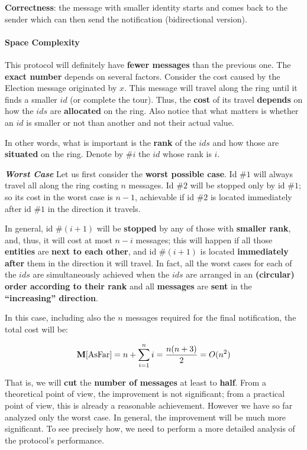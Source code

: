 \textbf{Correctness}: the message with smaller identity starts and comes back to the sender which can then send the notification (bidirectional version).

\paragraph{Space Complexity}
This protocol will definitely have \textbf{fewer messages} than the previous one. The \textbf{exact number} depends on several factors. Consider the cost caused by the Election message originated by $x$. This message will travel along the ring until it finds a smaller $id$ (or complete the tour). Thus, the \textbf{cost} of its travel \textbf{depends} on how the $ids$ are \textbf{allocated} on the ring. Also notice that what matters is whether an $id$ is smaller or not than another and not their actual value. 

In other words, what is important is the \textbf{rank} of the $ids$ and how those are \textbf{situated} on the ring. Denote by $\#i$ the $id$ whose rank is $i$. 

\textit{\textbf{Worst Case}}  Let us first consider the \textbf{worst possible case}. Id $\#1$ will always travel all along the ring costing $n$ messages. Id $\#2$ will be stopped only by id $\#1$; so its cost in the worst case is $n - 1$, achievable if id $\#2$ is located immediately after id $\#1$ in the direction it travels. 

In general, id $\#(i + 1)$ will be \textbf{stopped} by any of those with \textbf{smaller rank}, and, thus, it will cost at most $n - i$ messages; this will happen if all those \textbf{entities} are \textbf{next to each other}, and id $\#(i + 1)$ is located \textbf{immediately after} them in the direction it will travel. In fact, all the worst cases for each of the $ids$ are simultaneously achieved when the $ids$ are arranged in an \textbf{(circular) order according to their rank} and all \textbf{messages} are \textbf{sent} in the \textbf{“increasing” direction}. 


In this case, including also the $n$ messages required for the final notification, the total cost will be:

$$
\mathbf{M}[\text{AsFar}] = n + \sum_{i = 1}^n i = \frac{n(n+3)}{2} = O(n^2)
$$

That is, we will \textbf{cut} the \textbf{number of messages} at least to \textbf{half}. From a theoretical point of view, the improvement is not significant; from a practical point of view, this is already a reasonable achievement. However we have so far analyzed only the worst case. In general, the improvement will be much more significant. To see precisely how, we need to perform a more detailed analysis of the protocol’s performance.

